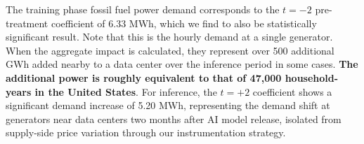 \documentclass[sigconf,authordraft]{acmart}
\begin{document}

The training phase fossil fuel power demand corresponds to the $t=-2$ pre-treatment coefficient of $6.33$ MWh, which we find to also be statistically significant result. Note that this is the hourly demand at a single generator.  When the aggregate impact is calculated, they represent over 500 additional GWh added nearby to a data center over the inference period in some cases. \textbf{The additional power is roughly equivalent to that of 47,000 household-years in the United States}. For inference, the $t=+2$ coefficient shows a significant demand increase of 5.20 MWh, representing the demand shift at generators near data centers two months after AI model release, isolated from supply-side price variation through our instrumentation strategy. 




\end{document}

